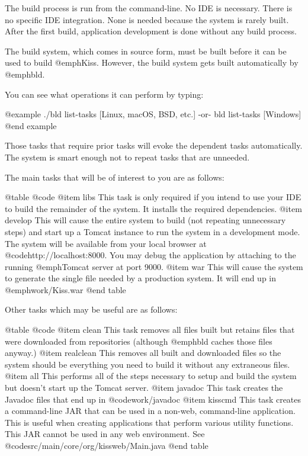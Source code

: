 The build process is run from the command-line.  No IDE is necessary.
There is no specific IDE integration.  None is needed because the system
is rarely built.  After the first build, application development is done
without any build process.

The build system, which comes in source form, must be built before it
can be used to build @emph{Kiss}.  However, the build system gets built
automatically by @emph{bld}.

You can see what operations it can perform by typing:

@example
    ./bld list-tasks           [Linux, macOS, BSD, etc.]
        -or-
    bld list-tasks             [Windows]
@end example

Those tasks that require prior tasks will evoke the dependent tasks
automatically.  The system is smart enough not to repeat tasks that
are unneeded.

The main tasks that will be of interest to you are as follows:

@table @code
@item libs
This task is only required if you intend to use your IDE to build the
remainder of the system.  It installs the required dependencies.
@item develop
This will cause the entire system to build (not repeating unnecessary
steps) and start up a Tomcat instance to run the system in a
development mode.  The system will be available from your local
browser at @code{http://localhost:8000}.  You may debug the
application by attaching to the running @emph{Tomcat} server at port
9000.
@item war
This will cause the system to generate the single file needed by a
production system.  It will end up in @emph{work/Kiss.war}
@end table

Other tasks which may be useful are as follows:

@table @code
@item clean
This task removes all files built but retains files that were downloaded from
repositories (although @emph{bld} caches those files anyway.)
@item realclean
This removes all built and downloaded files so the system should be everything
you need to build it without any extraneous files.
@item all
This performs all of the steps necessary to setup and build the system but
doesn't start up the Tomcat server.
@item javadoc
This task creates the Javadoc files that end up in @code{work/javadoc}
@item kisscmd
This task creates a command-line JAR that can be used in a non-web, command-line application.
This is useful when creating applications that perform various utility functions.  This
JAR cannot be used in any web environment.  See @code{src/main/core/org/kissweb/Main.java}
@end table

